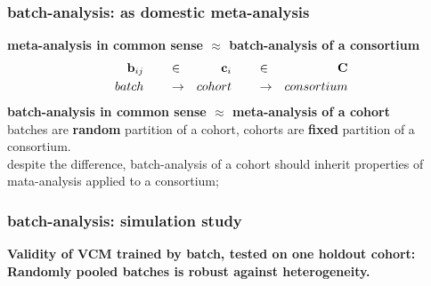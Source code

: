 \documentclass{beamer}
\begin{document}
\begin{frame}\frametitle{batch-analysis: as domestic meta-analysis}
  \textbf{meta-analysis in common sense $\approx$ batch-analysis of a
    consortium}
  \begin{align*}
    \mathbf{b}_{ij} & \qquad \in & \mathbf{c}_i  & \qquad \in & \mathbf{C} \\
    batch    & \qquad \to & cohort & \qquad \to & consortium
  \end{align*}
  \textbf{batch-analysis in common sense $\approx$ meta-analysis of a cohort} \\
  batches are {\color{red}\textbf{random}} partition of a cohort,
  cohorts are {\color{red}\textbf{fixed}} partition of a consortium. \\
  despite the difference, batch-analysis of a cohort should inherit
  properties of mata-analysis applied to a consortium;
\end{frame}
\begin{frame} \frametitle{batch-analysis: simulation study} %
  \textbf{Validity of VCM trained by batch, tested on one holdout
    cohort:} \textbf{Randomly pooled batches is robust against
    heterogeneity.}
\end{frame}
\end{document}
